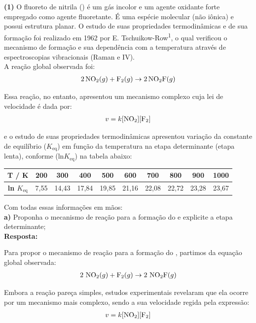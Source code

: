 \textbf{(1)} O fluoreto de nitrila () é um gás incolor e um agente oxidante forte empregado como agente fluoretante. É uma espécie molecular (não iônica) e possui estrutura planar. O estudo de suas propriedades termodinâmicas e de sua formação foi realizado em 1962 por E. Tschuikow-Row\textsuperscript{1}, o qual verificou o mecanismo de formação e sua dependência com a temperatura através de espectroscopias vibracionais (Raman e IV).\\

A reação global observada foi:
\begin{align*}
    2\,\ce{NO2}(g) + \ce{F2}(g) \rightarrow 2\,\ce{NO2F}(g)
\end{align*}

 Essa reação, no entanto, apresentou um mecanismo complexo cuja lei de velocidade é dada por:
\begin{align*}
    v = k[\ce{NO2}][\ce{F2}]
\end{align*}

e o estudo de suas propriedades termodinâmicas apresentou variação da constante de equilíbrio ($K_{\text{eq}}$) em função da temperatura na etapa determinante (etapa lenta), conforme (ln$K_{\text{eq}}$) na tabela abaixo:

\begin{center}
\begin{tabular}{|c|c|c|c|c|c|c|c|c|c|}
\hline
\textbf{T / K} & 200 & 300 & 400 & 500 & 600 & 700 & 800 & 900 & 1000 \\
\hline
\textbf{ln $K_{\text{eq}}$} & 7,55 & 14,43 & 17,84 & 19,85 & 21,16 & 22,08 & 22,72 & 23,28 & 23,67 \\
\hline
\end{tabular}
\end{center}

\bigskip

Com todas essas informações em mãos:\\

\textbf{a)} Proponha o mecanismo de reação para a formação do  e explicite a etapa determinante;\\

\textbf{Resposta:} 

Para propor o mecanismo de reação para a formação do , partimos da equação global observada:
\begin{align*}
2\ \ce{NO2}(g) + \ce{F2}(g) \rightarrow 2\ \ce{NO2F}(g)
\end{align*}

Embora a reação pareça simples, estudos experimentais revelaram que ela ocorre por um mecanismo mais complexo, sendo a sua velocidade regida pela expressão:
\begin{align*}
v = k[\ce{NO2}][\ce{F2}]
\end{align*}


